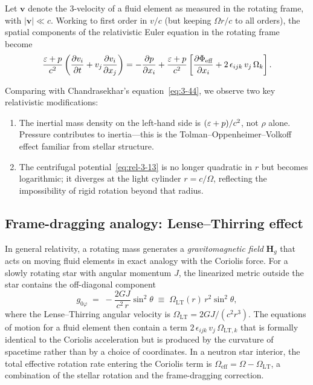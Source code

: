Let $\mathbf{v}$ denote the 3-velocity of a fluid element as measured
in the rotating frame, with $|\mathbf{v}| \ll c$.  Working to first
order in $v/c$ (but keeping $\Omega r/c$ to all orders), the spatial
components of the relativistic Euler equation in the rotating frame
become
\begin{equation}\label{eq:rel-3-14}
  \frac{\varepsilon + p}{c^{2}}
  \left(
  \frac{\partial v_{i}}{\partial t}
  + v_{j}\frac{\partial v_{i}}{\partial x_{j}}
  \right)
  =
  -\frac{\partial p}{\partial x_{i}}
  + \frac{\varepsilon + p}{c^{2}}
  \left[
  \frac{\partial\Phi_{\text{eff}}}{\partial x_{i}}
  + 2\,\epsilon_{ijk}\,v_{j}\,\Omega_{k}
  \right].
\end{equation}

\begin{relcorrection}
Comparing with Chandrasekhar's equation~\eqref{eq:3-44}, we observe
two key relativistic modifications:
\begin{enumerate}
  \item The inertial mass density on the left-hand side is
    $(\varepsilon + p)/c^{2}$, not $\rho$ alone.  Pressure contributes to
    inertia---this is the Tolman--Oppenheimer--Volkoff effect familiar
    from stellar structure.
  \item The centrifugal potential~\eqref{eq:rel-3-13} is no longer
    quadratic in $r$ but becomes logarithmic; it diverges at the
    light cylinder $r = c/\Omega$, reflecting the impossibility of
    rigid rotation beyond that radius.
\end{enumerate}
\end{relcorrection}

\subsection{Frame-dragging analogy: Lense--Thirring effect}

In general relativity, a rotating mass generates a
\emph{gravitomagnetic field} $\mathbf{H}_{g}$ that acts on moving
fluid elements in exact analogy with the Coriolis force.  For a slowly
rotating star with angular momentum $J$, the linearized metric outside
the star contains the off-diagonal component
\begin{equation}\label{eq:rel-3-15}
  g_{0\varphi}
  \;=\;
  -\frac{2GJ}{c^{2}\,r}\sin^{2}\!\theta
  \;\equiv\;
  \Omega_{\mathrm{LT}}(r)\,r^{2}\sin^{2}\!\theta,
\end{equation}
where the Lense--Thirring angular velocity is
$\Omega_{\mathrm{LT}} = 2GJ/(c^{2}r^{3})$.
The equations of motion for a fluid element then contain a term
$2\,\epsilon_{ijk}\,v_{j}\,\Omega_{\mathrm{LT},k}$ that is formally
identical to the Coriolis acceleration but is produced by the curvature
of spacetime rather than by a choice of coordinates.  In a neutron star
interior, the total effective rotation rate entering the Coriolis term
is $\Omega_{\text{eff}} = \Omega - \Omega_{\mathrm{LT}}$, a combination
of the stellar rotation and the frame-dragging correction.


